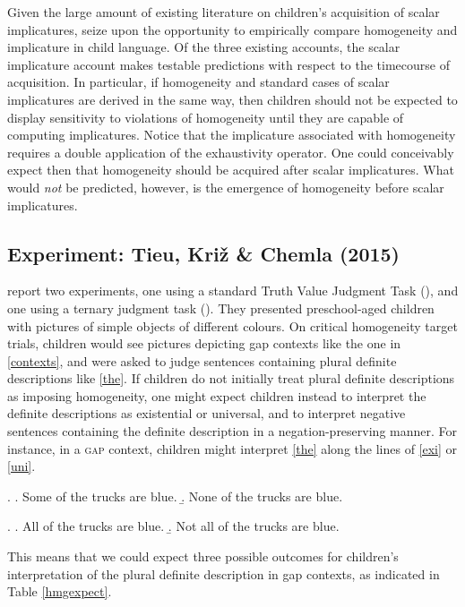 \documentclass[12pt, letterpaper]{article}
\begin{document}
{Given the large amount of existing literature on children's acquisition of scalar implicatures, \cite*{Tieu:2015i,Tieu:2015k} seize upon the opportunity to empirically compare homogeneity and implicature in child language. Of the three existing accounts, the scalar implicature account makes testable predictions with respect to the timecourse of acquisition. In particular, if homogeneity and standard cases of scalar implicatures are derived in the same way, then children should not be expected to display sensitivity to violations of homogeneity until they are capable of computing implicatures. Notice that the implicature associated with homogeneity requires a double application of the exhaustivity operator. One could conceivably expect then that homogeneity should be acquired after scalar implicatures. What would \textit{not} be predicted, however, is the emergence of homogeneity before scalar implicatures. 

\subsection{Experiment: Tieu, Kri\v{z} \& Chemla (2015)}

\cite{Tieu:2015i,Tieu:2015k} report two experiments, one using a standard Truth Value Judgment Task (\citealt{Crain:2000}), and one using a ternary judgment task (\citealt{Katsos:2011}). They presented preschool-aged children with pictures of simple objects of different colours. On critical homogeneity target trials, children would see pictures depicting gap contexts like the one in \ref{contexts}, and were asked to judge sentences containing plural definite descriptions like \ref{the}. If children do not initially treat plural definite descriptions as imposing homogeneity, one might expect children instead to interpret the definite descriptions as existential or universal, and to interpret negative sentences containing the definite description in a negation-preserving manner. For instance, in a \textsc{gap} context, children might interpret \ref{the} along the lines of \ref{exi} or \ref{uni}. 

\ex. \label{exi} \a. Some of the trucks are blue.
\b. None of the trucks are blue.

\ex. \label{uni} \a. All of the trucks are blue.
\b. Not all of the trucks are blue.

This means that we could expect three possible outcomes for children's interpretation of the plural definite description in gap contexts, as indicated in Table \ref{hmgexpect}.

}
\end{document}
